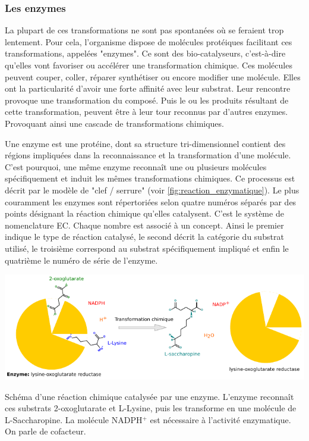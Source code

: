 \begin{refsegment}
    
    \subsubsection{Les enzymes}    
    La plupart de ces transformations ne sont pas spontanées où se feraient trop lentement. Pour cela, l'organisme dispose de molécules protéiques facilitant ces transformations, appelées "enzymes". Ce sont des bio-catalyseurs, c'est-à-dire qu'elles vont favoriser ou accélérer une transformation chimique. Ces molécules peuvent couper, coller, réparer synthétiser ou encore modifier une molécule. Elles ont la particularité d'avoir une forte affinité avec leur substrat.  Leur rencontre provoque une transformation du composé. Puis le ou les produits résultant de cette transformation, peuvent être à leur tour reconnus par d'autres enzymes. Provoquant ainsi une cascade de transformations chimiques. 
    
    Une enzyme est une protéine, dont sa structure tri-dimensionnel contient des régions impliquées dans la reconnaissance et la transformation d’une molécule. C'est pourquoi, une même enzyme reconnaît une ou plusieurs molécules spécifiquement et induit les mêmes transformations chimiques. Ce processus est décrit par le modèle de "clef / serrure" (voir \cref{fig:reaction_enzymatique}). Le plus couramment les enzymes sont répertoriées selon quatre numéros séparés par des points désignant la réaction chimique qu'elles catalysent. C'est le système de nomenclature \acrfull{EC}. Chaque nombre est associé à un concept. Ainsi le premier indique le type de réaction catalysé,  le second décrit la catégorie du substrat utilisé, le troisième correspond au substrat spécifiquement impliqué et enfin le quatrième le numéro de série de l'enzyme.
    
    \begin{shadedfigure}[H]
        \centering
        \includegraphics[width=\textwidth]{img/lysine-oxoglutarate_reductase.pdf}
        \caption{Schéma d'une réaction chimique catalysée par une enzyme. L'enzyme reconnaît ces substrats 2-oxoglutarate et L-Lysine, puis les transforme en une molécule de L-Saccharopine. La molécule NADPH$^{+}$ est nécessaire à l'activité enzymatique. On parle de cofacteur.}
        \label{fig:reaction_enzymatique}
    \end{shadedfigure}
    

\end{refsegment}
